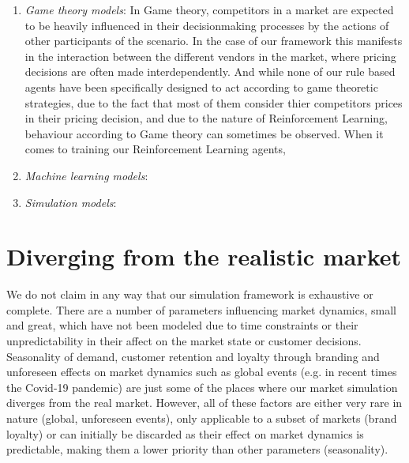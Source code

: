 \begin{enumerate}
	\item \emph{Game theory models}: In Game theory, competitors in a market are expected to be heavily influenced in their decisionmaking processes by the actions of other participants of the scenario.  In the case of our framework this manifests in the interaction between the different vendors in the market, where pricing decisions are often made interdependently. And while none of our rule based agents have been specifically designed to act according to game theoretic strategies, due to the fact that most of them consider thier competitors prices in their pricing decision, and due to the nature of Reinforcement Learning, behaviour according to Game theory can sometimes be observed.  When it comes to training our Reinforcement Learning agents,

	\item \emph{Machine learning models}:

	\item \emph{Simulation models}:
\end{enumerate}


\section{Diverging from the realistic market}

We do not claim in any way that our simulation framework is exhaustive or complete. There are a number of parameters influencing market dynamics, small and great, which have not been modeled due to time constraints or their unpredictability in their affect on the market state or customer decisions. Seasonality of demand, customer retention and loyalty through branding and unforeseen effects on market dynamics such as global events (e.g. in recent times the Covid-19 pandemic) are just some of the places where our market simulation diverges from the real market. However, all of these factors are either very rare in nature (global, unforeseen events), only applicable to a subset of markets (brand loyalty) or can initially be discarded as their effect on market dynamics is predictable, making them a lower priority than other parameters (seasonality).
